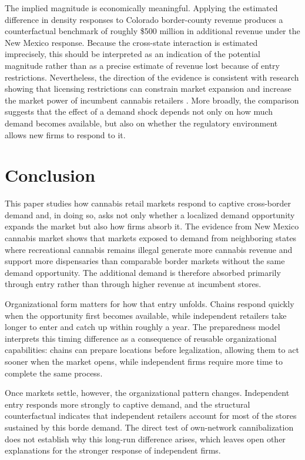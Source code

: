 \documentclass[english,12pt]{article}
\begin{document}
The implied magnitude is economically meaningful. Applying the estimated difference in density responses to Colorado border-county revenue produces a counterfactual benchmark of roughly \$500 million in additional revenue under the New Mexico response. Because the cross-state interaction is estimated imprecisely, this should be interpreted as an indication of the potential magnitude rather than as a precise estimate of revenue lost because of entry restrictions.
 Nevertheless, the direction of the evidence is consistent with research showing that licensing restrictions can constrain market expansion \citep{thomas2019license} and increase the market power of incumbent cannabis retailers \citep{HollenbeckUetake2021}. More broadly, the comparison suggests that the effect of a demand shock depends not only on how much demand becomes available, but also on whether the regulatory environment allows new firms to respond to it.

\section{Conclusion}
\label{conclusion}

This paper studies how cannabis retail markets respond to captive cross-border demand and, in doing so, asks not only whether a localized demand opportunity expands the market but also how firms absorb it. The evidence from New Mexico cannabis market shows that markets exposed to demand from neighboring states where recreational cannabis remains illegal generate more cannabis revenue and support more dispensaries than comparable border markets without the same demand opportunity. The additional demand is therefore absorbed primarily through entry rather than through higher revenue at incumbent stores.

Organizational form matters for how that entry unfolds. Chains respond quickly when the opportunity first becomes available, while independent retailers take longer to enter and catch up within roughly a year. The preparedness model interprets this timing difference as a consequence of reusable organizational capabilities: chains can prepare locations before legalization, allowing them to act sooner when the market opens, while independent firms require more time to complete the same process.

Once markets settle, however, the organizational pattern changes. Independent entry responds more strongly to captive demand, and the structural counterfactual indicates that independent retailers account for most of the stores sustained by this borde demand. The direct test of own-network cannibalization does not establish why this long-run difference arises, which leaves open other explanations for the stronger response of independent firms.
\end{document}
